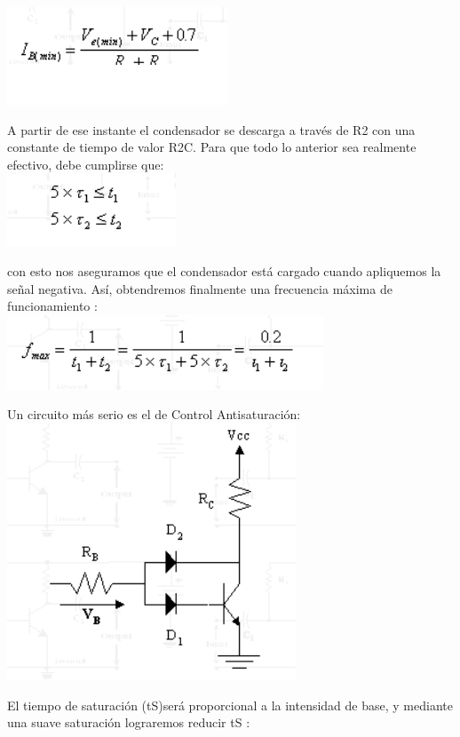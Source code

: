 \documentclass[10pt,a4paper]{article}
\begin{document}
\centering
\includegraphics[scale=.70]{cal3.png}\\
\raggedright 
A partir de ese instante el condensador se descarga a través de R2 con una constante de tiempo de valor R2C.
\bigskip
Para que todo lo anterior sea realmente efectivo, debe cumplirse que:\\
\centering
\includegraphics[scale=.70]{cal4.png}\\ 
\raggedright 
con esto nos aseguramos que el condensador está cargado cuando apliquemos la señal negativa. Así, obtendremos finalmente una frecuencia máxima de funcionamiento :\\
\centering
\includegraphics[scale=.70]{fmax.png}\\ 
\raggedright 
Un circuito más serio es el de Control Antisaturación:\\
\centering
\includegraphics[scale=.80]{dia.png}\\
\raggedright 
El tiempo de saturación (tS)será proporcional a la intensidad de base, y mediante una suave saturación lograremos reducir tS :\\
\end{document}
